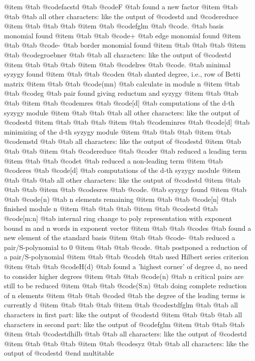 {@item @tab @code{facstd}
@tab @code{F} @tab found a new factor
@item @tab @tab @tab all other characters: like the output of @code{std} and @code{reduce}
@item @tab @tab @tab
@item @tab @code{fglm}
@tab @code{.} @tab basis monomial found
@item @tab @tab @code{+} @tab edge monomial found
@item @tab @tab @code{-} @tab border monomial found
@item @tab @tab @tab
@item @tab @code{groebner} @tab @tab all characters: like the output of @code{std}
@item @tab @tab @tab
@item @tab @code{lres}
@tab @code{.} @tab minimal syzygy found
@item @tab @tab @code{n} @tab slanted degree, i.e., row of Betti matrix
@item @tab @tab @code{(mn)} @tab calculate in module n
@item @tab @tab @code{g} @tab pair found giving reductum and syzygy
@item @tab @tab @tab
@item @tab @code{mres}
@tab @code{[d]}
@tab computations of the d-th syzygy module
@item @tab @tab @tab all other characters: like the output of @code{std}
@item @tab @tab @tab
@item @tab @code{minres}
@tab @code{[d]}
@tab minimizing of the d-th syzygy module
@item @tab @tab @tab
@item @tab @code{mstd} @tab @tab all characters: like the output of @code{std}
@item @tab @tab @tab
@item @tab @code{reduce}
@tab @code{r} @tab reduced a leading term
@item @tab @tab @code{t} @tab reduced a non-leading term
@item @tab @code{res}
@tab @code{[d]}
@tab computations of the d-th syzygy module
@item @tab @tab @tab all other characters: like the output of @code{std}
@item @tab @tab @tab
@item @tab @code{sres}
@tab @code{.} @tab syzygy found
@item @tab @tab @code{(n)} @tab n elements remaining
@item @tab @tab @code{[n]} @tab finished module n
@item @tab @tab @tab
@item @tab @code{std}
@tab @code{[m:n]}
@tab internal ring change to poly representation with exponent bound
m and n words in exponent vector
@item @tab @tab @code{s} @tab found a new element of the standard basis
@item @tab @tab @code{-} @tab reduced a pair/S-polynomial to 0
@item @tab @tab @code{.} @tab postponed a reduction of a pair/S-polynomial
@item @tab @tab @code{h} @tab used Hilbert series criterion
@item @tab @tab @code{H(d)} @tab found a 'highest corner' of degree d, no need to consider higher degrees
@item @tab @tab @code{(n)} @tab n critical pairs are still to be reduced
@item @tab @tab @code{(S:n)} @tab doing complete reduction of n elements
@item @tab @tab @code{d} @tab the degree of the leading terms is currently d
@item @tab @tab @tab
@item @tab @code{stdfglm} @tab @tab all characters in first part: like the output of @code{std}
@item @tab @tab @tab all characters in second part: like the output of @code{fglm}
@item @tab @tab @tab
@item @tab @code{stdhilb} @tab @tab all characters: like the output of @code{std}
@item @tab @tab @tab
@item @tab @code{syz} @tab @tab all characters: like the output of @code{std}
@end multitable


}
